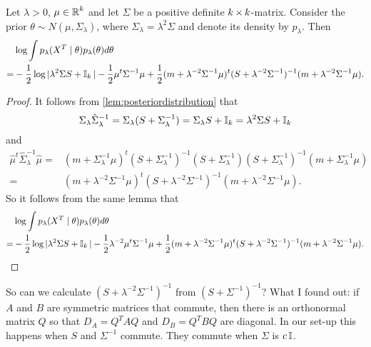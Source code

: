 \documentclass[12pt]{article}
\begin{document}
\begin{lemma}\label{lem:marginallikelihood}
Let $\lambda>0$, $\mu\in\operatorname{\mathbb{R}}^k$ and let $\Sigma$ be a positive definite $k\operatorname{\times} k$-matrix. Consider the prior \(\theta\sim N(\mu,\Sigma_\lambda)\), where \(\Sigma_\lambda=\lambda^2\Sigma \) and denote its density by $p_\lambda$. Then 
\begin{equation}\label{eq:marginallikelihood}
\begin{split}
  &\log \int  p_\lambda(X^T\mid\theta)p_\lambda(\theta)d\theta  \\= &-\frac12\log |\lambda^2\Sigma  S + \operatorname{\mathbb{I}}_k|  -\frac12\mu^t\Sigma^{-1}\mu+ \frac12(m + \lambda^{-2}\Sigma^{-1}\mu)^t ( S + \lambda^{-2}\Sigma^{-1} )^{-1} (m + \lambda^{-2}\Sigma^{-1}\mu).
\end{split}
\end{equation}

\end{lemma}
\begin{proof}It follows from \cref{lem:posteriordistribution} that 
  \[
\Sigma_\lambda \hat \Sigma_\lambda ^{-1} = \Sigma_\lambda (S+\Sigma_\lambda ^{-1})= \Sigma_\lambda  S + \operatorname{\mathbb{I}}_k=\lambda^2\Sigma  S + \operatorname{\mathbb{I}}_k
\]
and\begin{align*}
\hat \mu^t \hat\Sigma_\lambda^{-1} \hat\mu =&  (m + \Sigma_\lambda^{-1}\mu)^t( S + \Sigma_\lambda^{-1} )^{-1}( S + \Sigma_\lambda^{-1} )( S + \Sigma_\lambda^{-1} )^{-1} (m + \Sigma_\lambda^{-1}\mu)\\
=&  (m + \lambda^{-2}\Sigma^{-1}\mu)^t ( S + \lambda^{-2}\Sigma^{-1} )^{-1} (m + \lambda^{-2}\Sigma^{-1}\mu). 
\end{align*}
So it follows from the same lemma that 
\begin{align*}
    &\log \int  p_\lambda(X^T\mid\theta)p_\lambda(\theta)d\theta  \\= &-\frac12\log |\lambda^2\Sigma  S + \operatorname{\mathbb{I}}_k|  -\frac12\lambda^{-2}\mu^t\Sigma^{-1}\mu+ \frac12(m + \lambda^{-2}\Sigma^{-1}\mu)^t ( S + \lambda^{-2}\Sigma^{-1} )^{-1} (m + \lambda^{-2}\Sigma^{-1}\mu).
\end{align*}
\end{proof}

{\color{magenta}
So can we calculate $(S+\lambda^{-2}\Sigma^{-1})^{-1}$ from $(S+\Sigma^{-1})^{-1}$?
}
{\color{cyan}
What I found out: if $A$ and $B$ are symmetric matrices that commute, then there is an orthonormal matrix $Q$ so that $D_A = Q^TAQ$ and $D_B=Q^TBQ$ are diagonal. In our set-up this happens when $S$ and $\Sigma^{-1}$ commute. They commute when $\Sigma$ is $c\operatorname{\mathbb{I}}$.  
}
\end{document}
